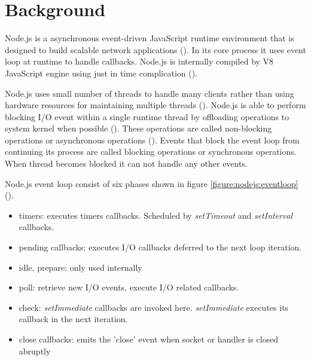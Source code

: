 \chapter{Background\label{background}}
Node.js is a asynchronous event-driven JavaScript runtime environment that is designed to build scalable network applications (\cite{node.jsAbout}).
In its core process it uses event loop at runtime to handle callbacks.
Node.js is internally compiled by V8 JavaScript engine using just in time complication (\cite{nodejsTheV8}).

Node.js uses small number of threads to handle many clients rather than using hardware resources for maintaining multiple threads (\cite{node.jsOverviewBlockVsNonBlock}).
Node.js is able to perform blocking I/O event within a single runtime thread by offloading operations to system kernel when possible (\cite{node.jsEventLoop}).
These operations are called non-blocking operations or asynchronous operations (\cite{node.jsOverviewBlockVsNonBlock}).
Events that block the event loop from continuing its process are called blocking operations or synchronous operations.
When thread becomes blocked it can not handle any other events.

Node.js event loop consist of six phases shown in figure \ref{figure:nodejs:eventloop} (\cite{node.jsEventLoop}).
\begin{itemize}
    \item
    timers: executes timers callbacks. Scheduled by \textit{setTimeout} and \textit{setInterval} callbacks.
    \item
    pending callbacks: executes I/O callbacks deferred to the next loop iteration.
    \item
    idle, prepare: only used internally
    \item
    poll: retrieve new I/O events, execute I/O related callbacks.
    \item
    check: \textit{setImmediate} callbacks are invoked here. \textit{setImmediate} executes its callback in the next iteration.
    \item
    close callbacks: emits the 'close' event when socket or handler is closed abruptly
\end{itemize}


